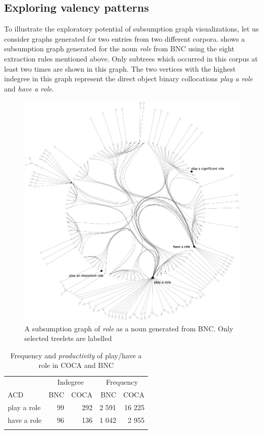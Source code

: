 \documentclass[output=paper]{langscibook}
\begin{document}
\subsection{Exploring valency patterns}

To illustrate the exploratory potential of subsumption graph visualizations, let us consider graphs generated for two entries from two different corpora.  shows a subsumption graph generated for the noun \textit{role} from BNC using the eight extraction rules mentioned above. Only subtrees which occurred in this corpus at least two times are shown in this graph. The two vertices with the highest indegree in this graph represent the direct object binary collocations \textit{play a role} and \textit{have a role}. 

  
\begin{figure}
\includegraphics[width=\textwidth]{figures/pezik-img004.png}
\caption{A subsumption graph of \textit{role} as a noun generated from BNC. Only selected treelets are labelled\label{fig:pezik:4}}
\end{figure}


\begin{table}
\begin{tabular}{lrr rr}
\lsptoprule
& \multicolumn{2}{c}{Indegree} & \multicolumn{2}{c}{Frequency}\\\cmidrule(lr){2-3}\cmidrule(lr){4-5}
ACD & BNC & COCA & BNC & COCA\\\midrule
play a role & 99 & 292 & 2 591 & 16 225\\
have a role & 96 & 136 & 1 042 & 2 955\\
\lspbottomrule
\end{tabular}
\caption{\label{tab:pezik:11}Frequency and \textit{productivity} of play/have a role in COCA and BNC}
\end{table}
\end{document}
